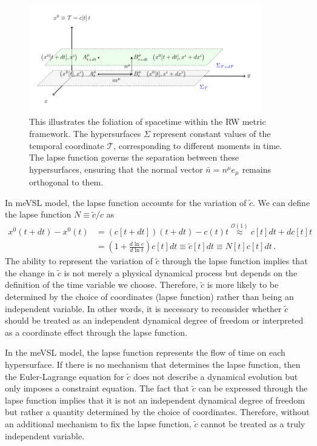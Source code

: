 \documentclass[jkps,preprint,fleqn]{revtex4} %
\newcommand{\tc}{\tilde{c}}
\begin{document}
\begin{figure}%
	\begin{center}
	\includegraphics[width=0.9\textwidth]{Fig2.pdf} 
	\caption{This illustrates the foliation of spacetime within the RW metric framework. The hypersurfaces $\Sigma$ represent constant values of the temporal coordinate $\mathcal{T}$, corresponding to different moments in time. The lapse function governs the separation between these hypersurfaces, ensuring that the normal vector $\bar{n} = n^{\mu} e_{\mu}$ remains orthogonal to them.}
	\label{Fig2}
	\end{center}
\end{figure}

In meVSL model, the lapse function accounts for the variation of $\tc$. We can define the lapse function $N \equiv \tc/c$ as 
\begin{align}
x^{0}(t+dt) - x^{0}(t) &=  \left( c[t+dt] \right) \left( t+dt \right) - c(t) t \overset{\mathcal{O}(1)}{\approx} c[t] dt + dc[t] t \nonumber \\
	&= \left( 1 + \frac{d \ln c}{d \ln t} \right) c[t] dt \equiv \tilde{c}[t] dt \equiv N[t] c[t] dt \label{NmeVSL} \,.
\end{align}
The ability to represent the variation of $\tc$ through the lapse function implies that the change in $\tc$ is not merely a physical dynamical process but depends on the definition of the time variable we choose. Therefore, $\tc$ is more likely to be determined by the choice of coordinates (lapse function) rather than being an independent variable. In other words, it is necessary to reconsider whether $\tc$ should be treated as an independent dynamical degree of freedom or interpreted as a coordinate effect through the lapse function.

In the meVSL model, the lapse function represents the flow of time on each hypersurface. If there is no mechanism that determines the lapse function, then the Euler-Lagrange equation for $\tc$ does not describe a dynamical evolution but only imposes a constraint equation.  The fact that $\tc$ can be expressed through the lapse function implies that it is not an independent dynamical degree of freedom but rather a quantity determined by the choice of coordinates. Therefore, without an additional mechanism to fix the lapse function,  $\tc$ cannot be treated as a truly independent variable. 
\end{document}
